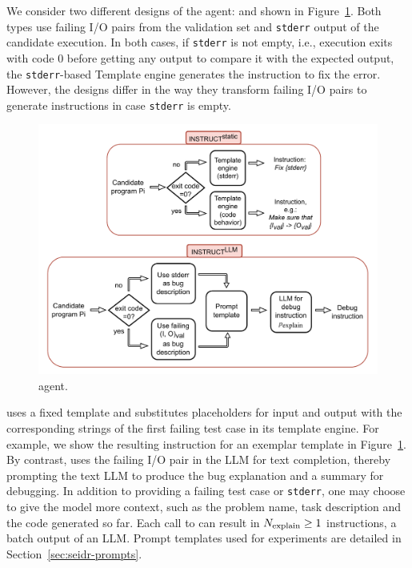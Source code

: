 We consider two different designs of the \instruct{} agent: \instructs{} and \instructllm{} shown in Figure~\ref{fig:method-instruct}. 
Both types use failing I/O pairs from the validation set and \texttt{stderr} output of the candidate execution. 
In both cases, if \texttt{stderr} is not empty, i.e., execution exits with code 0 before getting any output to compare it with the expected output, the \texttt{stderr}-based Template engine generates the instruction to fix the error. 
However, the designs differ in the way they transform failing I/O pairs to generate instructions in case \texttt{stderr} is empty.

\begin{figure}[H]
    \centering
    \includegraphics[width=\linewidth,trim={0mm 0mm 0mm 0mm}]{images/codex-for-psb-seidr-instruct-2.drawio.pdf}
    \caption{\instruct{} agent.}
    \label{fig:method-instruct}
\end{figure}

\instructs{} uses a fixed template and substitutes placeholders for input and output with the corresponding strings of the first failing test case in its template engine.
For example, we show the resulting instruction for an exemplar template in Figure~\ref{fig:method-instruct}.
By contrast, \instructllm{} uses the failing I/O pair in the LLM for text completion, thereby prompting the text LLM to produce the bug explanation and a summary for debugging. 
In addition to providing a failing test case or \texttt{stderr}, one may choose to give the model \textmodel{} more context, such as the problem name, task description and the code generated so far. 
Each call to \textmodel{} can result in $N_\text{explain}{}\ge1$ instructions, a batch output of an LLM.
Prompt templates used for experiments are detailed in Section~\ref{sec:seidr-prompts}.

